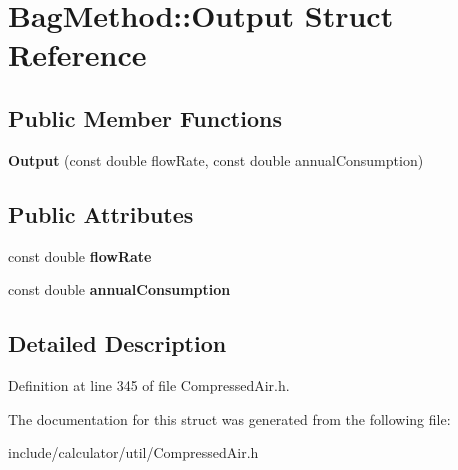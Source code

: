 \hypertarget{struct_bag_method_1_1_output}{}\section{Bag\+Method\+:\+:Output Struct Reference}
\label{struct_bag_method_1_1_output}
\subsection*{Public Member Functions}
\begin{DoxyCompactItemize}
\item 
\mbox{\label{struct_bag_method_1_1_output_a32476edc4a2b924580f0976732cb9aa0}} 
{\bfseries Output} (const double flow\+Rate, const double annual\+Consumption)
\end{DoxyCompactItemize}
\subsection*{Public Attributes}
\begin{DoxyCompactItemize}
\item 
\mbox{\label{struct_bag_method_1_1_output_a6625c932cfa3935a7198b8ed1747955f}} 
const double {\bfseries flow\+Rate}
\item 
\mbox{\label{struct_bag_method_1_1_output_ae287da01450815f1cc6d22b39944482a}} 
const double {\bfseries annual\+Consumption}
\end{DoxyCompactItemize}


\subsection{Detailed Description}


Definition at line 345 of file Compressed\+Air.\+h.



The documentation for this struct was generated from the following file\+:\begin{DoxyCompactItemize}
\item 
include/calculator/util/Compressed\+Air.\+h\end{DoxyCompactItemize}
